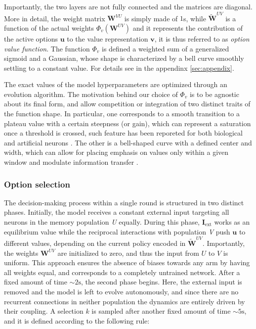 \noindent Importantly, the two layers are not fully connected and the matrices are diagonal.
More in detail, the weight matrix $\textbf{W}^{VU}$ is simply made of $1$s, while $\tilde{\textbf{W}}^{UV}$ is a function of the actual weights $\Phi_{v}(\textbf{W}^{UV})$ and it represents the contribution of the active options $\textbf{u}$ to the value representation $\textbf{v}$, it is thus referred to as \textit{option value function}.
The function $\Phi_{v}$ is defined a weighted sum of a generalized sigmoid and a Gaussian, whose shape is characterized by a bell curve smoothly settling to a constant value. For details see in the appendinx \ref{sec:appendix}.

The exact values of the model hyperparameters are optimized through an evolution algorithm. The motivation behind our choice of $\Phi_{v}$ is to be agnostic about its final form, and allow competition or integration of two distinct traits of the function shape.
In particular, one corresponds to a smooth transition to a plateau value with a certain steepness (or gain), which can represent a saturation once a threshold is crossed, such feature has been reporeted for both biological and artificial neurons \cite{ockerFlexibleNeuralConnectivity2020, apicellaSurveyModernTrainable2021}.
The other is a bell-shaped curve with a defined center and width, which can allow for placing emphasis on values only within a given window and modulate information transfer \cite{millerCombinedMechanismsNeural2019}.

\subsubsection{Option selection}
The decision-making process within a single round is structured in two distinct phases. Initially, the model receives a constant external input targeting all neurons in the memory population \textit{U} equally.
During this phase, $\textbf{I}_{\text{ext}}$ works as an equilibrium value while the reciprocal interactions with population \textit{V} push $\textbf{u}$ to different values, depending on the current policy encoded in $\tilde{\textbf{W}}^{UV}$.
Importantly, the weights $\textbf{W}^{UV}$ are initialized to zero, and thus the input from $U$ to $V$ is uniform. This approach ensures the absence of biases towards any arm by having all weights equal, and corresponds to a completely untrained network.
After a fixed amount of time $\sim 2 \text{s}$, the second phase begins. Here, the external input is removed and the model is left to evolve autonomously, and since there are no recurrent connections in neither population the dynamics are entirely driven by their coupling.
A selection $k$ is sampled after another fixed amount of time $\sim 5 \text{s}$, and it is defined according to the following rule:

